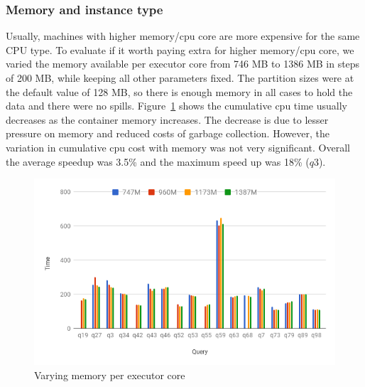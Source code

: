\noindent\subsubsection*{Memory and instance type}
 Usually, machines with higher memory/cpu core are more expensive for the same CPU type. To evaluate if it worth paying extra for higher memory/cpu core, we  varied the memory available per executor core from 746 MB to 1386 MB in steps of 200 MB, while keeping all other parameters fixed.   The partition sizes were at the default value of 128 MB, so there is enough memory in all cases to hold the data and there were no spills. Figure~\ref{fig:varymem} shows  the cumulative cpu time usually decreases as the container memory increases. The decrease is due to lesser pressure on memory and reduced costs of garbage collection.  However, the variation in cumulative cpu cost with memory was not very significant. Overall the average speedup was 3.5\% and the maximum speed up was 18\% ($q3$). 

\begin{figure}[h]
	\includegraphics[width=\linewidth]{fig/varymem.png}
	\caption{Varying memory per executor core \protect\footnotemark[1]}
	\label{fig:varymem}
\end{figure}

